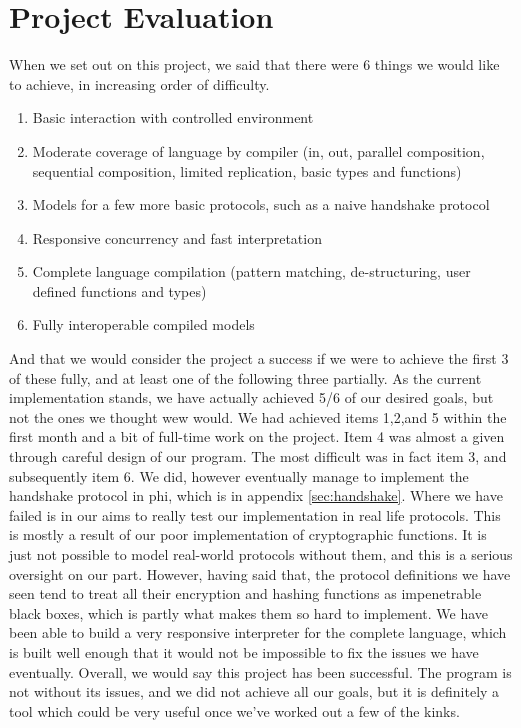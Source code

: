 \section{Project Evaluation}

When we set out on this project, we said that there were 6 things we would like to achieve, in increasing order of difficulty.
\begin{enumerate}
    \item Basic interaction with controlled environment
    \item Moderate coverage of language by compiler (in, out, parallel composition, sequential composition, limited replication, basic types and functions) 
    \item Models for a few more basic protocols, such as a naive handshake protocol
    \item Responsive concurrency and fast interpretation
    \item Complete language compilation (pattern matching, de-structuring, user defined functions and types)
    \item Fully interoperable compiled models
\end{enumerate}
And that we would consider the project a success if we were to achieve the first 3 of these fully, and at least one of the following three partially.
As the current implementation stands, we have actually achieved 5/6 of our desired goals, but not the ones we thought wew would. We had achieved items 1,2,and 5 within the first month and a bit of full-time work on the project. Item 4 was almost a given through careful design of our program. The most difficult was in fact item 3, and subsequently item 6. We did, however eventually manage to implement the handshake protocol in phi, which is in appendix \ref{sec:handshake}.
Where we have failed is in our aims to really test our implementation in real life protocols. This is mostly a result of our poor implementation of cryptographic functions. It is just not
possible to model real-world protocols without them, and this is a serious oversight on our part. However, having said that, the protocol definitions we have seen tend to treat all their encryption and hashing functions as impenetrable black boxes, which is partly what makes them so hard to implement.
We have been able to build a very responsive interpreter for the complete language, which is built well enough that it would not be impossible to fix the issues we have eventually.
Overall, we would say this project has been successful. The program is not without its issues, and we did not achieve all our goals, but it is definitely a tool which could be very useful once we've worked out a few of the kinks.

